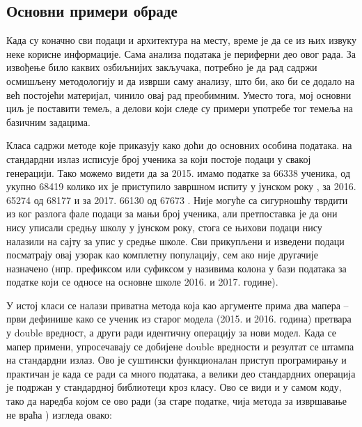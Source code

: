 \subsection{Основни примери обраде}\label{subs:osn_obrada}

Када су коначно сви подаци и архитектура на месту, време је да се из њих извуку неке корисне информације. Сама анализа података је периферни део овог рада. За извођење било каквих озбиљнијих закључака, потребно је да рад садржи осмишљену методологију и да изврши саму анализу, што би, ако би се додало на већ постојећи материјал, чинило овај рад преобимним. Уместо тога, мој основни циљ је поставити темељ, а делови који следе су примери употребе тог темеља на базичним задацима.

Класа  садржи методе које приказују како доћи до основних особина података.  на стандардни излаз исписује број ученика за који постоје подаци у свакој генерацији. Тако можемо видети да за 2015. имамо податке за 66338 ученика, од укупно 68419 колико их је приступило завршном испиту у јунском року \citep{izvestaj15}, за 2016. 65274 од 68177 \citep{izvestaj16manjine} и за 2017. 66130 од 67673 \citep{izvestaj17manjine}. Није могуће са сигурношћу тврдити из ког разлога фале подаци за мањи број ученика, али претпоставка је да они нису уписали средњу школу у јунском року, стога се њихови подаци нису налазили на сајту за упис у средње школе. Сви прикупљени и изведени подаци посматрају овај узорак као комплетну популацију, сем ако није другачије назначено (нпр. префиксом  или суфиксом  у називима колона у бази података за податке који се односе на основне школе 2016. и 2017. године).

У истој класи се налази приватна метода  која као аргументе прима два мапера -- први дефинише како се ученик из старог модела (2015. и 2016. година) претвара у double вредност, а други ради идентичну операцију за нови модел. Када се мапер примени, упросечавају се добијене double вредности и резултат се штампа на стандардни излаз. Ово је суштински функционалан приступ програмирању и практичан је када се ради са много података, а велики део стандардних операција је подржан у стандардној библиотеци кроз  класу. Ово се види и у самом коду, тако да наредба којом се ово ради (за старе податке, чија метода за извршавање не враћа ) изгледа овако:

